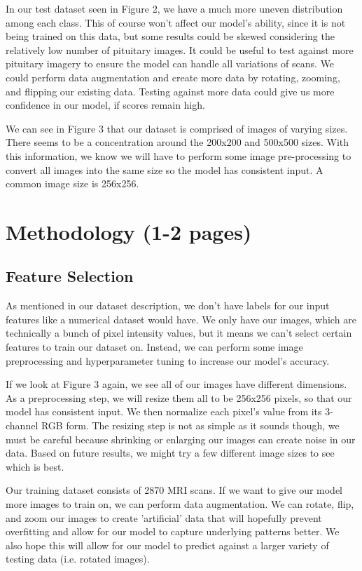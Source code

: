 \documentclass[conference]{IEEEtran}
\begin{document}
In our test dataset seen in Figure 2, we have a much more uneven distribution among each class. This of course won't affect our model's ability, since it is not being trained on this data, but some results could be skewed considering the relatively low number of pituitary images. It could be useful to test against more pituitary imagery to ensure the model can handle all variations of scans. We could perform data augmentation and create more data by rotating, zooming, and flipping our existing data. Testing against more data could give us more confidence in our model, if scores remain high.

We can see in Figure 3 that our dataset is comprised of images of varying sizes. There seems to be a concentration around the 200x200 and 500x500 sizes. With this information, we know we will have to perform some image pre-processing to convert all images into the same size so the model has consistent input. A common image size is 256x256.

\section{\large Methodology (1-2 pages)}

\subsection{Feature Selection}
As mentioned in our dataset description, we don't have labels for our input features like a numerical dataset would have. We only have our images, which are technically a bunch of pixel intensity values, but it means we can't select certain features to train our dataset on. Instead, we can perform some image preprocessing and hyperparameter tuning to increase our model's accuracy.

If we look at Figure 3 again, we see all of our images have different dimensions.  As a preprocessing step, we will resize them all to be 256x256 pixels, so that our model has consistent input. We then normalize each pixel's value from its 3-channel RGB form. The resizing step is not as simple as it sounds though, we must be careful because shrinking or enlarging our images can create noise in our data. Based on future results, we might try a few different image sizes to see which is best. 

Our training dataset consists of 2870 MRI scans. If we want to give our model more images to train on, we can perform data augmentation. We can rotate, flip, and zoom our images to create 'artificial' data that will hopefully prevent overfitting and allow for our model to capture underlying patterns better. We also hope this will allow for our model to predict against a larger variety of testing data (i.e. rotated images). 
\end{document}

